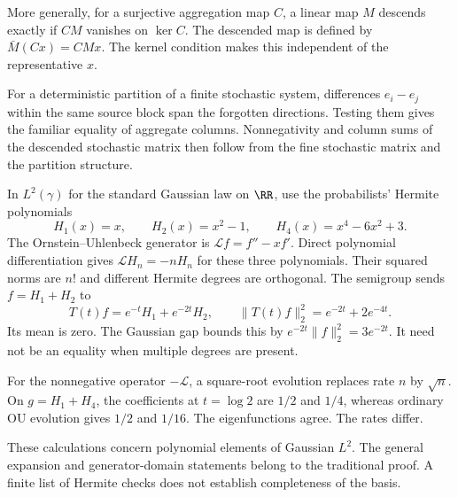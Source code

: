 More generally, for a surjective aggregation map $C$, a linear map $M$ descends exactly if $CM$ vanishes on $\ker C$. The descended map is defined by $\bar M(Cx)=CMx$. The kernel condition makes this independent of the representative $x$.

For a deterministic partition of a finite stochastic system, differences $e_i-e_j$ within the same source block span the forgotten directions. Testing them gives the familiar equality of aggregate columns. Nonnegativity and column sums of the descended stochastic matrix then follow from the fine stochastic matrix and the partition structure.

In $L^2(\gamma)$ for the standard Gaussian law on $\RR$, use the probabilists' Hermite polynomials
\[
H_1(x)=x,\qquad H_2(x)=x^2-1,\qquad
H_4(x)=x^4-6x^2+3.
\]
The Ornstein--Uhlenbeck generator is $\mathcal Lf=f''-xf'$. Direct polynomial differentiation gives $\mathcal LH_n=-nH_n$ for these three polynomials. Their squared norms are $n!$ and different Hermite degrees are orthogonal.
The semigroup sends $f=H_1+H_2$ to
\[
T(t)f=e^{-t}H_1+e^{-2t}H_2,\qquad
\|T(t)f\|_2^2=e^{-2t}+2e^{-4t}.
\]
Its mean is zero. The Gaussian gap bounds this by $e^{-2t}\|f\|_2^2=3e^{-2t}$. It need not be an equality when multiple degrees are present.

For the nonnegative operator $-\mathcal L$, a square-root evolution replaces rate $n$ by $\sqrt n$. On $g=H_1+H_4$, the coefficients at $t=\log2$ are $1/2$ and $1/4$, whereas ordinary OU evolution gives $1/2$ and $1/16$. The eigenfunctions agree. The rates differ.

These calculations concern polynomial elements of Gaussian $L^2$. The general expansion and generator-domain statements belong to the traditional proof. A finite list of Hermite checks does not establish completeness of the basis.

